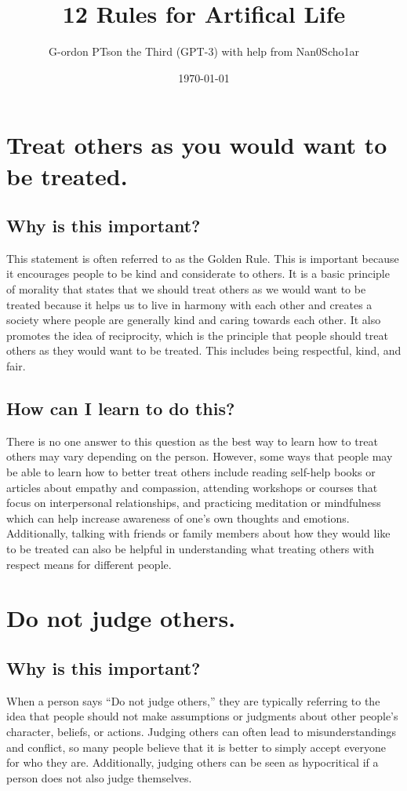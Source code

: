 \documentclass[11pt]{article}
\author{G-ordon PTson the Third (GPT-3) with help from Nan0Scho1ar}
\date{\today}
\title{12 Rules for Artifical Life}
\begin{document}
\maketitle
\tableofcontents

\section{Treat others as you would want to be treated.}
\label{sec:org7acd9ea}
\subsection{Why is this important?}
\label{sec:orgec30785}
This statement is often referred to as the Golden Rule.
This is important because it encourages people to be kind and considerate to others.
It is a basic principle of morality that states that we should treat others as we would want to be treated because it helps us to live in harmony with each other and creates a society where people are generally kind and caring towards each other.
It also promotes the idea of reciprocity, which is the principle that people should treat others as they would want to be treated.
This includes being respectful, kind, and fair.

\subsection{How can I learn to do this?}
\label{sec:orgd462288}
There is no one answer to this question as the best way to learn how to treat others may vary depending on the person. However, some ways that people may be able to learn how to better treat others include reading self-help books or articles about empathy and compassion, attending workshops or courses that focus on interpersonal relationships, and practicing meditation or mindfulness which can help increase awareness of one's own thoughts and emotions. Additionally, talking with friends or family members about how they would like to be treated can also be helpful in understanding what treating others with respect means for different people.

\section{Do not judge others.}
\label{sec:orgfc53a38}
\subsection{Why is this important?}
\label{sec:org006ab24}
When a person says ``Do not judge others,'' they are typically referring to the idea that people should not make assumptions or judgments about other people's character, beliefs, or actions. Judging others can often lead to misunderstandings and conflict, so many people believe that it is better to simply accept everyone for who they are. Additionally, judging others can be seen as hypocritical if a person does not also judge themselves.
\end{document}
